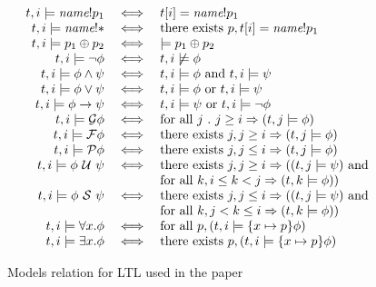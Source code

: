 \documentclass{llncs}
\newcommand{\aset}[1]{\{#1\}}
\newcommand{\sch}{\textit{name}}
\newcommand{\tr}{t\xspace}
\newcommand{\talways}{\mathcal{G}}
\newcommand{\tfuture}{\mathcal{F}}
\newcommand{\tuntil}{~\mathcal{U}~}
\newcommand{\tsince}{~\mathcal{S}~}
\newcommand{\tpast}{\mathcal{P}}
\newcommand{\limplies}{\rightarrow}
\newcommand{\mimplies}{\Rightarrow}
\begin{document}
\begin{figure}[!t]
  \small
  \begin{displaymath}
    \begin{array}{rcl}
      \tr , i \models \sch {!}p_1 & \iff & \tr[i] = \sch {!}p_1 \\
      \tr , i \models \sch {!}* & \iff & \hbox{there exists } p,
      \tr[i] = \sch {!}p_1 \\
      \tr , i \models p_1 \oplus p_2 & \iff & \models p_1 \oplus p_2 \\
      
      \tr, i \models \neg \phi & \iff &
      \tr, i  \not \models \phi \\

      \tr, i  \models \phi \land \psi & \iff &
      \tr, i  \models \phi \hbox{ and } \tr, i  \models \psi \\

      \tr, i  \models \phi \lor \psi & \iff &
      \tr, i  \models \phi \hbox{ or } \tr, i  \models \psi \\

      \tr, i  \models \phi \limplies \psi & \iff &
      \tr, i  \models \psi \hbox{ or } \tr, i  \models
      \lnot \phi \\

      \tr, i  \models \talways \phi & \iff &
      \hbox{for all } j ~.~ j \geq i \mimplies (\tr, j  \models \phi) \\

      \tr, i  \models \tfuture \phi & \iff &
      \hbox{there exists } j, j \geq i \mimplies (\tr, j  \models \phi) \\

      \tr, i  \models \tpast \phi & \iff &
      \hbox{there exists } j, j \leq i \mimplies (\tr, j  \models \phi) \\

      \tr, i  \models \phi \tuntil \psi & \iff &
      \hbox{there exists } j, j \geq i \mimplies ((\tr, j  \models \psi)
      \hbox{ and } \\
      & & \hbox{for all } k, i \leq k < j \mimplies (\tr, k 
      \models \phi)) \\

      \tr, i  \models \phi \tsince \psi & \iff &
      \hbox{there exists } j, j \leq i \mimplies ((\tr, j  \models \psi)
      \hbox{ and } \\
      & & \hbox{for all } k, j < k \leq i \mimplies (\tr, k 
      \models \phi)) \\

      \tr, i  \models \forall x. \phi & \iff &
      \hbox{for all } p, (\tr, i  \models \aset{x\mapsto p} \phi) \\

      \tr, i  \models \exists x. \phi & \iff &
      \hbox{there exists } p, (\tr, i  \models \aset{x\mapsto p} \phi) \\
    \end{array}
  \end{displaymath}
  \caption{Models relation for LTL used in the paper}
  \label{fig:ltl}
\end{figure}
\end{document}
